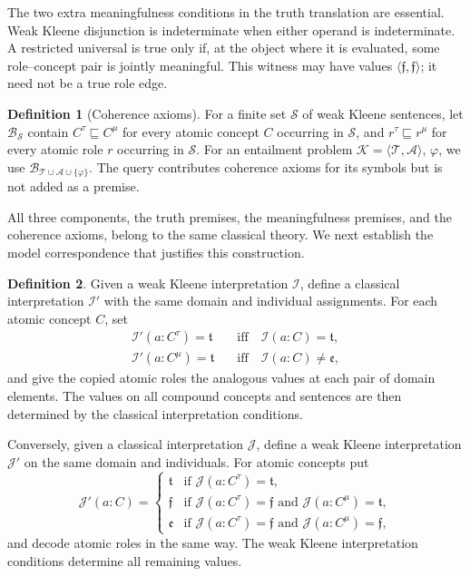 \documentclass[letterpaper]{article} %
\theoremstyle{definition}
\theoremstyle{definition}
\newtheorem{definition}{Definition}
\theoremstyle{definition}
\theoremstyle{definition}
\theoremstyle{definition}
\newcommand{\vt}{\mathfrak{t}}
\newcommand{\vf}{\mathfrak{f}}
\newcommand{\vu}{\mathfrak{e}}
\begin{document}
The two extra meaningfulness conditions in the truth translation are essential. Weak Kleene disjunction is indeterminate when either operand is indeterminate. A restricted universal is true only if, at the object where it is evaluated, some role--concept pair is jointly meaningful. This witness may have values $\langle\vf,\vf\rangle$; it need not be a true role edge.

\begin{definition}[Coherence axioms]\label{def:coherence}
For a finite set $\mathcal{S}$ of weak Kleene sentences, let $\mathcal{B}_{\mathcal{S}}$ contain $C^{\tau}\sqsubseteq C^{\mu}$ for every atomic concept $C$ occurring in $\mathcal{S}$, and $r^{\tau}\sqsubseteq r^{\mu}$ for every atomic role $r$ occurring in $\mathcal{S}$. For an entailment problem $\mathcal{K}=\langle\mathcal{T},\mathcal{A}\rangle$, $\varphi$, we use $\mathcal{B}_{\mathcal{T}\cup\mathcal{A}\cup\{\varphi\}}$. The query contributes coherence axioms for its symbols but is not added as a premise.
\end{definition}

All three components, the truth premises, the meaningfulness premises, and the coherence axioms, belong to the same classical theory. We next establish the model correspondence that justifies this construction.

\begin{definition}\label{def:classical-encoding}
Given a weak Kleene interpretation $\mathcal{I}$, define a classical interpretation $\mathcal{I}'$ with the same domain and individual assignments. For each atomic concept $C$, set
\begin{align*}
\mathcal{I}'(a:C^{\tau})=\vt
 &\quad\text{iff}\quad\mathcal{I}(a:C)=\vt,\\
\mathcal{I}'(a:C^{\mu})=\vt
 &\quad\text{iff}\quad\mathcal{I}(a:C)\neq\vu,
\end{align*}
and give the copied atomic roles the analogous values at each pair of domain elements. The values on all compound concepts and sentences are then determined by the classical interpretation conditions.

Conversely, given a classical interpretation $\mathcal{J}$, define a weak Kleene interpretation $\mathcal{J}'$ on the same domain and individuals. For atomic concepts put
\[
\mathcal{J}'(a:C)=\begin{cases}
\vt&\text{if }\mathcal{J}(a:C^{\tau})=\vt,\\
\vf&\text{if }\mathcal{J}(a:C^{\tau})=\vf\text{ and }\mathcal{J}(a:C^{\mu})=\vt,\\
\vu&\text{if }\mathcal{J}(a:C^{\tau})=\vf\text{ and }\mathcal{J}(a:C^{\mu})=\vf,
\end{cases}
\]
and decode atomic roles in the same way. The weak Kleene interpretation conditions determine all remaining values.
\end{definition}
\end{document}
